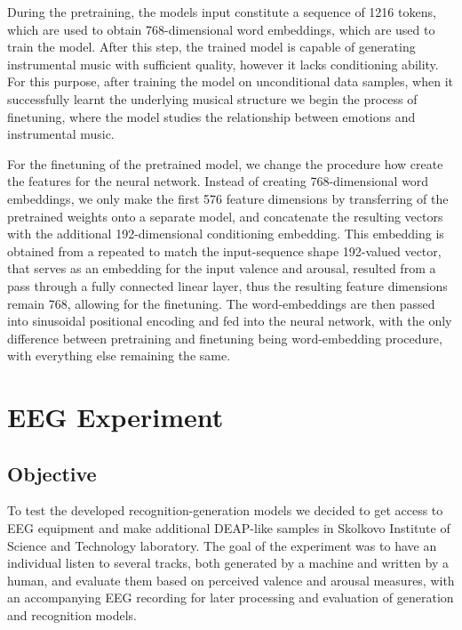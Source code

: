 \documentclass[14pt]{extreport}
\begin{document}
During the pretraining, the models input constitute a sequence of 1216 tokens, which are used to obtain 768-dimensional word embeddings, which are used to train the model. After this step, the trained model is capable of generating instrumental music with sufficient quality, however it lacks conditioning ability. For this purpose, after training the model on unconditional data samples, when it successfully learnt the underlying musical structure we begin the process of finetuning, where the model studies the relationship between emotions and instrumental music.

For the finetuning of the pretrained model, we change the procedure how create the features for the neural network. Instead of creating 768-dimensional word embeddings, we only make the first 576 feature dimensions by transferring of the pretrained weights onto a separate model, and concatenate the resulting vectors with the additional 192-dimensional conditioning embedding. This embedding is obtained from a repeated to match the input-sequence shape 192-valued vector, that serves as an embedding for the input \gls{valence} and \gls{arousal}, resulted from a pass through a fully connected linear layer, thus the resulting feature dimensions remain 768, allowing for the finetuning. The word-embeddings are then passed into sinusoidal positional encoding and fed into the neural network, with the only difference between pretraining and finetuning being word-embedding procedure, with everything else remaining the same.

\section{EEG Experiment}
\subsection{Objective}
To test the developed recognition-generation models we decided to get access to EEG equipment and make additional DEAP-like samples in Skolkovo Institute of Science and Technology laboratory. The goal of the experiment was to have an individual listen to several tracks, both generated by a machine and written by a human, and evaluate them based on perceived \gls{valence} and \gls{arousal} measures, with an accompanying EEG recording for later processing and evaluation of generation and recognition models.
\end{document}
